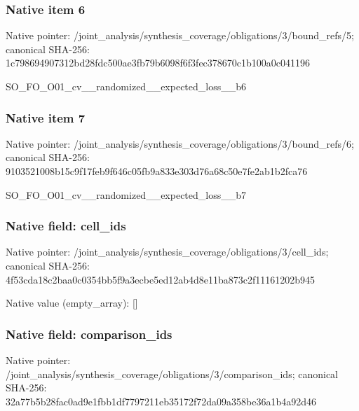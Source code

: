 \documentclass[10pt,a4paper]{article}
\begin{document}
\subsubsection{Native item 6}
Native pointer: /joint\_\allowbreak{}analysis/synthesis\_\allowbreak{}coverage/obligations/3/bound\_\allowbreak{}refs/5; canonical SHA-256: 1c798694907312bd28fdc500ae3fb79b6098f6f3fec378670c1b100a0c041196

\begingroup\raggedright\sloppy SO\_\allowbreak{}FO\_\allowbreak{}O01\_\allowbreak{}cv\_\allowbreak{}\_\allowbreak{}randomized\_\allowbreak{}\_\allowbreak{}expected\_\allowbreak{}loss\_\allowbreak{}\_\allowbreak{}b6\par\endgroup

\subsubsection{Native item 7}
Native pointer: /joint\_\allowbreak{}analysis/synthesis\_\allowbreak{}coverage/obligations/3/bound\_\allowbreak{}refs/6; canonical SHA-256: 9103521008b15c9f17feb9f646c05fb9a833e303d76a68c50e7fe2ab1b2fca76

\begingroup\raggedright\sloppy SO\_\allowbreak{}FO\_\allowbreak{}O01\_\allowbreak{}cv\_\allowbreak{}\_\allowbreak{}randomized\_\allowbreak{}\_\allowbreak{}expected\_\allowbreak{}loss\_\allowbreak{}\_\allowbreak{}b7\par\endgroup

\subsubsection{Native field: cell\_\allowbreak{}ids}
Native pointer: /joint\_\allowbreak{}analysis/synthesis\_\allowbreak{}coverage/obligations/3/cell\_\allowbreak{}ids; canonical SHA-256: 4f53cda18c2baa0c0354bb5f9a3ecbe5ed12ab4d8e11ba873c2f11161202b945

Native value (empty\_\allowbreak{}array): []

\subsubsection{Native field: comparison\_\allowbreak{}ids}
Native pointer: /joint\_\allowbreak{}analysis/synthesis\_\allowbreak{}coverage/obligations/3/comparison\_\allowbreak{}ids; canonical SHA-256: 32a77b5b28fac0ad9e1fbb1df7797211eb35172f72da09a358be36a1b4a92d46
\end{document}
